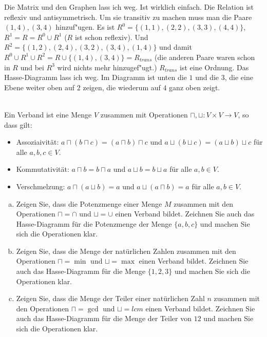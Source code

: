 \begin{loesung}
Die Matrix und den Graphen lass ich weg. Ist wirklich einfach.
Die Relation ist reflexiv und antisymmetrisch.
Um sie transitiv zu machen muss man die Paare $(1,4),(3,4)$ hinzuf"ugen.
Es ist $R^0=\{(1,1),(2,2),(3,3),(4,4)\}$, $R^1=R=R^0\cup R^1$ ($R$ ist schon reflexiv). Und $R^2=\{(1,2),(2,4),(3,2),(3,4),(1,4)\}$ und damit $R^0\cup R^1\cup R^2=R\cup\{(1,4),(3,4)\}=R_{trans}$ (die anderen Paare waren schon in $R$ und bei $R^3$ wird nichts mehr hinzugef"ugt.)
$R_{trans}$ ist eine Ordnung. Das Hasse-Diagramm lass ich weg. Im Diagramm ist unten die $1$ und die $3$, die eine Ebene weiter oben auf $2$ zeigen, die wiederum auf $4$ ganz oben zeigt.
\end{loesung}

\\
Ein Verband ist eine Menge $V$ zusammen mit Operationen $\sqcap, \sqcup:V\times V\to V$, so dass gilt:
\begin{itemize}
  \item Assoziaivität: $a \sqcap (b \sqcap c) = (a \sqcap b) \sqcap c$ und $a \sqcup (b \sqcup c) = (a \sqcup b) \sqcup c$ für alle $a,b,c \in V$.
  \item Kommutativität: $a \sqcap b = b \sqcap a$ und $a \sqcup b = b \sqcup a$ für alle $a,b \in V$.
  \item Verschmelzung: $a \sqcap (a \sqcup b) = a$ und $a \sqcup (a \sqcap b) = a$ für alle $a,b \in V$.
\end{itemize}
\begin{enumerate}[a)]
  \item Zeigen Sie, dass die Potenzmenge einer Menge $M$ zusammen mit den Operationen $\sqcap = \cap$ und $\sqcup = \cup$ einen Verband bildet. Zeichnen Sie auch das Hasse-Diagramm für die Potenzmenge der Menge $\{a,b,c\}$ und machen Sie sich die Operationen klar.
  \item Zeigen Sie, dass die Menge der natürlichen Zahlen zusammen mit den Operationen $\sqcap = \min$ und $\sqcup = \max$ einen Verband bildet. Zeichnen Sie auch das Hasse-Diagramm für die Menge $\{1,2,3\}$ und machen Sie sich die Operationen klar.
  \item Zeigen Sie, dass die Menge der Teiler einer natürlichen Zahl $n$ zusammen mit den Operationen $\sqcap = \gcd$ und $\sqcup = lcm$ einen Verband bildet. Zeichnen Sie auch das Hasse-Diagramm für die Menge der Teiler von $12$ und machen Sie sich die Operationen klar.
\end{enumerate}

